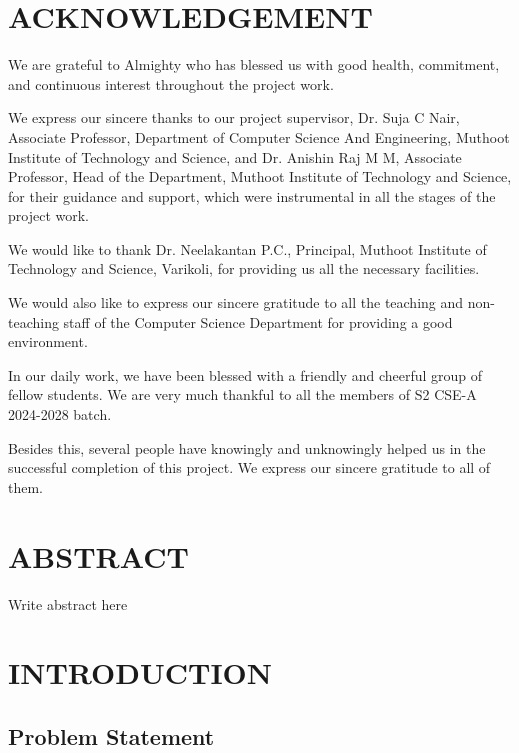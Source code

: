 \documentclass[a4paper,12pt]{report}
\begin{document}
\newpage


\chapter*{ACKNOWLEDGEMENT}

We are grateful to Almighty who has blessed us with good health, commitment, and continuous interest throughout the project work.

We express our sincere thanks to our project supervisor, Dr. Suja C Nair, Associate Professor, Department of Computer Science And Engineering, Muthoot Institute of Technology and Science, and Dr. Anishin Raj M M, Associate Professor, Head of the Department, Muthoot Institute of Technology and Science, for their guidance and support, which were instrumental in all the stages of the project work.

We would like to thank Dr. Neelakantan P.C., Principal, Muthoot Institute of Technology and Science, Varikoli, for providing us all the necessary facilities.

We would also like to express our sincere gratitude to all the teaching and non-teaching staff of the Computer Science Department for providing a good environment.

In our daily work, we have been blessed with a friendly and cheerful group of fellow students. We are very much thankful to all the members of S2 CSE-A 2024-2028 batch.

Besides this, several people have knowingly and unknowingly helped us in the successful completion of this project. We express our sincere gratitude to all of them.

\newpage

\chapter*{ABSTRACT}
Write abstract here

\newpage

\tableofcontents
\newpage



\chapter{INTRODUCTION}
\section{Problem Statement}
\end{document}
